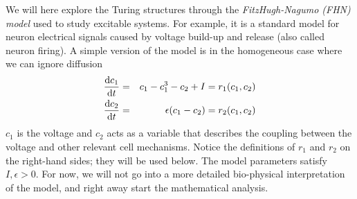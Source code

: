 We will here explore the Turing structures through the \emph{FitzHugh-Nagumo (FHN) model}
 used to study excitable systems. For example, it is a standard model for neuron electrical
signals caused by voltage build-up and release (also called neuron firing). A simple version of the model is in the 
homogeneous case where we can ignore diffusion
\begin{eqnarray}
	\label{eq:fhn1}
	\frac{\mathrm{d} c_1}{\mathrm{d} t} &=& c_1 - c_1^3 - c_2 + I = r_1(c_1, c_2)\\
	\label{eq:fhn2}
	\frac{\mathrm{d} c_2}{\mathrm{d} t} &=& \epsilon(c_1 - c_2) = r_2(c_1, c_2)
\end{eqnarray}
$c_1$ is the voltage and $c_2$ acts as a variable that describes the 
coupling between the voltage and other relevant cell mechanisms. Notice the definitions 
of $r_1$ and $r_2$ on the right-hand sides; they will be used below. 
The model parameters satisfy $I, \epsilon > 0$. For now, we will not go into a 
more detailed bio-physical interpretation of the model, and right away
start the mathematical analysis. 

